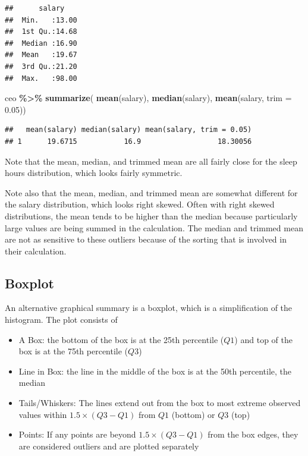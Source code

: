 \documentclass[
]{book}
\newenvironment{Shaded}{\begin{snugshade}}{\end{snugshade}}
\newcommand{\AttributeTok}[1]{\textcolor[rgb]{0.13,0.29,0.53}{#1}}
\newcommand{\FloatTok}[1]{\textcolor[rgb]{0.00,0.00,0.81}{#1}}
\newcommand{\FunctionTok}[1]{\textcolor[rgb]{0.13,0.29,0.53}{\textbf{#1}}}
\newcommand{\NormalTok}[1]{#1}
\newcommand{\SpecialCharTok}[1]{\textcolor[rgb]{0.81,0.36,0.00}{\textbf{#1}}}
\providecommand{\tightlist}{%
  \setlength{\itemsep}{0pt}\setlength{\parskip}{0pt}}
\begin{document}
\begin{verbatim}
##      salary     
##  Min.   :13.00  
##  1st Qu.:14.68  
##  Median :16.90  
##  Mean   :19.67  
##  3rd Qu.:21.20  
##  Max.   :98.00
\end{verbatim}

\begin{Shaded}
\begin{Highlighting}[]
\NormalTok{ceo }\SpecialCharTok{\%\textgreater{}\%}
  \FunctionTok{summarize}\NormalTok{(}
    \FunctionTok{mean}\NormalTok{(salary), }
    \FunctionTok{median}\NormalTok{(salary), }
    \FunctionTok{mean}\NormalTok{(salary, }\AttributeTok{trim =} \FloatTok{0.05}\NormalTok{))}
\end{Highlighting}
\end{Shaded}

\begin{verbatim}
##   mean(salary) median(salary) mean(salary, trim = 0.05)
## 1      19.6715           16.9                  18.30056
\end{verbatim}

Note that the mean, median, and trimmed mean are all fairly close for the sleep hours distribution, which looks fairly symmetric.

Note also that the mean, median, and trimmed mean are somewhat different for the salary distribution, which looks right skewed. Often with right skewed distributions, the mean tends to be higher than the median because particularly large values are being summed in the calculation. The median and trimmed mean are not as sensitive to these outliers because of the sorting that is involved in their calculation.

\subsection{Boxplot}\label{boxplot}

An alternative graphical summary is a boxplot, which is a simplification of the histogram. The plot consists of

\begin{itemize}
\tightlist
\item
  A Box: the bottom of the box is at the 25th percentile (\(Q1\)) and top of the box is at the 75th percentile (\(Q3\))
\item
  Line in Box: the line in the middle of the box is at the 50th percentile, the median
\item
  Tails/Whiskers: The lines extend out from the box to most extreme observed values within \(1.5 \times (Q3-Q1)\) from \(Q1\) (bottom) or \(Q3\) (top)
\item
  Points: If any points are beyond \(1.5 \times (Q3-Q1)\) from the box edges, they are considered outliers and are plotted separately
\end{itemize}
\end{document}
